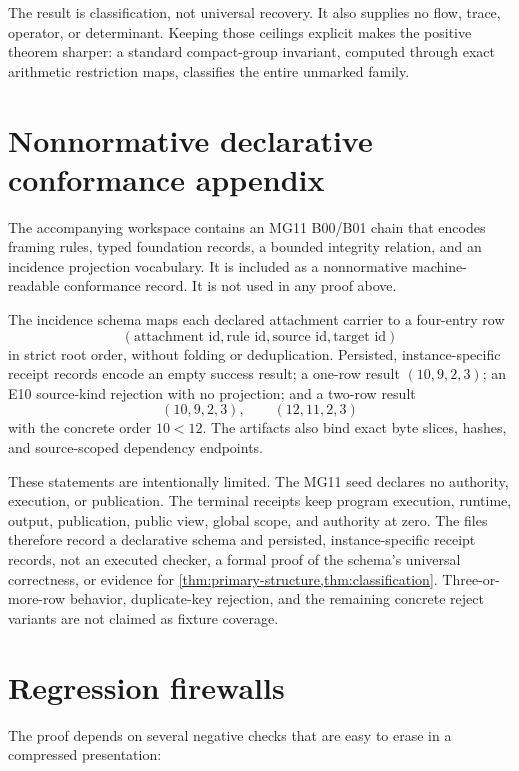 \documentclass[11pt]{article}
\theoremstyle{definition}
\begin{document}
The result is classification, not universal recovery.  It also supplies no
flow, trace, operator, or determinant.  Keeping those ceilings explicit makes
the positive theorem sharper: a standard compact-group invariant, computed
through exact arithmetic restriction maps, classifies the entire unmarked
family.

\appendix

\section{Nonnormative declarative conformance appendix}\label{app:mg11}

The accompanying workspace contains an MG11 B00/B01 chain that encodes
framing rules, typed foundation records, a bounded integrity relation, and an
incidence projection vocabulary.  It is included as a nonnormative
machine-readable conformance record.  It is not used in any proof above.

The incidence schema maps each declared attachment carrier to a four-entry
row
\[
(\text{attachment id},\text{rule id},\text{source id},\text{target id})
\]
in strict root order, without folding or deduplication.  Persisted,
instance-specific receipt records encode an empty success result; a one-row result
$(10,9,2,3)$; an E10 source-kind rejection with no projection; and a two-row
result
\[
(10,9,2,3),\qquad(12,11,2,3)
\]
with the concrete order $10<12$.  The artifacts also bind exact byte slices,
hashes, and source-scoped dependency endpoints.

These statements are intentionally limited.  The MG11 seed declares no
authority, execution, or publication.  The terminal receipts keep program
execution, runtime, output, publication, public view, global scope, and
authority at zero.  The files therefore record a declarative schema and
persisted, instance-specific receipt records, not an executed checker, a formal proof of the
schema's universal correctness, or evidence for
\cref{thm:primary-structure,thm:classification}.  Three-or-more-row behavior,
duplicate-key rejection, and the remaining concrete reject variants are not
claimed as fixture coverage.

\section{Regression firewalls}\label{app:firewalls}

The proof depends on several negative checks that are easy to erase in a
compressed presentation:
\end{document}
